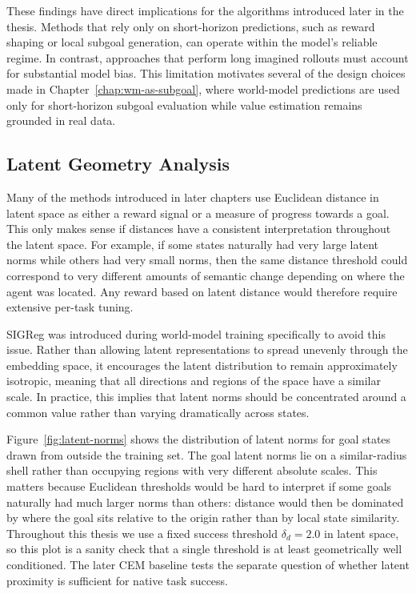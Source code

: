 These findings have direct implications for the algorithms introduced
later in the thesis. Methods that rely only on short-horizon
predictions, such as reward shaping or local subgoal generation, can
operate within the model's reliable regime. In contrast, approaches
that perform long imagined rollouts must account for substantial model
bias. This limitation motivates several of the design choices made in
Chapter~\ref{chap:wm-as-subgoal}, where world-model predictions are used only for
short-horizon subgoal evaluation while value estimation remains
grounded in real data.

\subsection{Latent Geometry Analysis}
\label{sec:wm-geometry}

Many of the methods introduced in later chapters use Euclidean distance
in latent space as either a reward signal or a measure of progress
towards a goal. This only makes sense if distances have a consistent
interpretation throughout the latent space. For example, if some states
naturally had very large latent norms while others had very small norms,
then the same distance threshold could correspond to very different
amounts of semantic change depending on where the agent was located.
Any reward based on latent distance would therefore require extensive
per-task tuning.

SIGReg was introduced during world-model training specifically to avoid
this issue. Rather than allowing latent representations to spread
unevenly through the embedding space, it encourages the latent
distribution to remain approximately isotropic, meaning that all
directions and regions of the space have a similar scale. In practice,
this implies that latent norms should be concentrated around a common
value rather than varying dramatically across states.

Figure~\ref{fig:latent-norms} shows the distribution of latent norms for
goal states drawn from outside the training set. The goal latent norms lie on a
similar-radius shell rather than occupying regions with very different
absolute scales. This matters because Euclidean thresholds would be hard
to interpret if some goals naturally had much larger norms than others:
distance would then be dominated by where the goal sits relative to the
origin rather than by local state similarity. Throughout this thesis we
use a fixed success threshold $\delta_d = 2.0$ in latent space, so this
plot is a sanity check that a single threshold is at least geometrically
well conditioned. The later CEM baseline tests the separate question of
whether latent proximity is sufficient for native task success.

